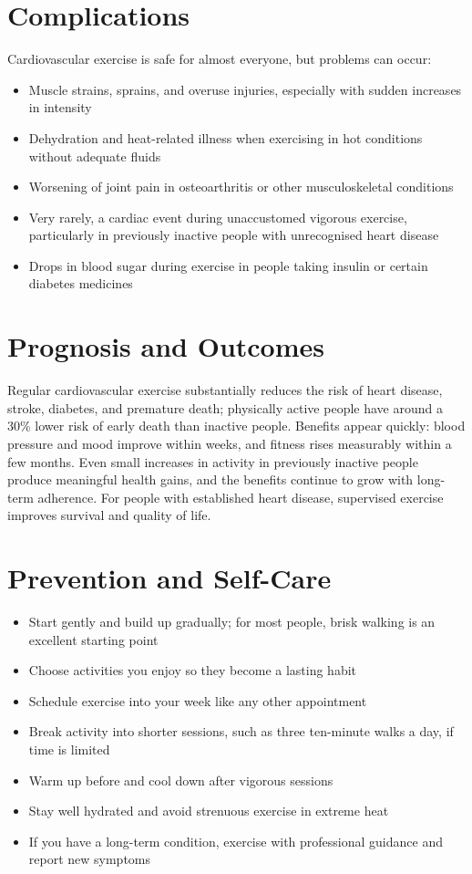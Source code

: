 \section*{Complications}
Cardiovascular exercise is safe for almost everyone, but problems can occur:
\begin{itemize}
    \item Muscle strains, sprains, and overuse injuries, especially with sudden increases in intensity
    \item Dehydration and heat-related illness when exercising in hot conditions without adequate fluids
    \item Worsening of joint pain in osteoarthritis or other musculoskeletal conditions
    \item Very rarely, a cardiac event during unaccustomed vigorous exercise, particularly in previously inactive people with unrecognised heart disease
    \item Drops in blood sugar during exercise in people taking insulin or certain diabetes medicines
\end{itemize}

\section*{Prognosis and Outcomes}
Regular cardiovascular exercise substantially reduces the risk of heart disease, stroke, diabetes, and premature death; physically active people have around a 30\% lower risk of early death than inactive people. Benefits appear quickly: blood pressure and mood improve within weeks, and fitness rises measurably within a few months. Even small increases in activity in previously inactive people produce meaningful health gains, and the benefits continue to grow with long-term adherence. For people with established heart disease, supervised exercise improves survival and quality of life.

\section*{Prevention and Self-Care}
\begin{itemize}
    \item Start gently and build up gradually; for most people, brisk walking is an excellent starting point
    \item Choose activities you enjoy so they become a lasting habit
    \item Schedule exercise into your week like any other appointment
    \item Break activity into shorter sessions, such as three ten-minute walks a day, if time is limited
    \item Warm up before and cool down after vigorous sessions
    \item Stay well hydrated and avoid strenuous exercise in extreme heat
    \item If you have a long-term condition, exercise with professional guidance and report new symptoms
\end{itemize}

